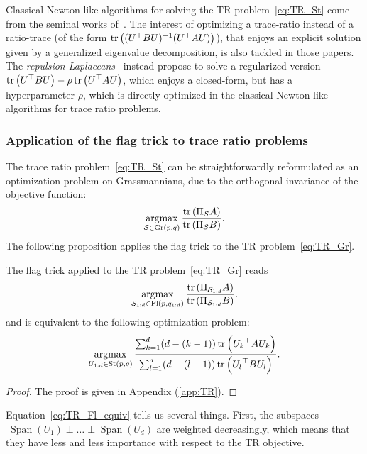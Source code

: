 Classical Newton-like algorithms for solving the TR problem~\eqref{eq:TR_St} come from the seminal works of~\citet{guo_generalized_2003, wang_trace_2007, jia_trace_2009}.
The interest of optimizing a trace-ratio instead of a ratio-trace (of the form $\operatorname{tr}\left((U^\top B U)^{-1}(U^\top A U)\right)$), that enjoys an explicit solution given by a generalized eigenvalue decomposition, is also tackled in those papers. The \textit{repulsion Laplaceans}~\citep{kokiopoulou_enhanced_2009} instead propose to solve a regularized version $\operatorname{tr}\left(U^\top B U\right) - \rho \operatorname{tr}\left(U^\top A U\right)$, which enjoys a closed-form, but has a hyperparameter $\rho$, which is directly optimized in the classical Newton-like algorithms for trace ratio problems.

\subsubsection{Application of the flag trick to trace ratio problems}
The trace ratio problem~\eqref{eq:TR_St} can be straightforwardly reformulated as an optimization problem on Grassmannians, due to the orthogonal invariance of the objective function:
\begin{equation}\label{eq:TR_Gr}
\underset{\mathcal{S} \in \operatorname{Gr}(p, q)}{\operatorname{argmax}} \, \frac{\operatorname{tr}\left(\Pi_{\mathcal{S}} A\right)}{\operatorname{tr}\left(\Pi_{\mathcal{S}} B\right)}.
\end{equation}
The following proposition applies the flag trick to the TR problem~\eqref{eq:TR_Gr}.
\begin{proposition}\label{prop:TR}
The flag trick applied to the TR problem~\eqref{eq:TR_Gr} reads
\begin{equation}\label{eq:TR_Fl}
	\underset{\mathcal{S}_{1:d} \in \operatorname{Fl}(p, q_{1:d})}{\operatorname{argmax}} \, \frac{\operatorname{tr}\left(\Pi_{\mathcal{S}_{1:d}} A\right)}{\operatorname{tr}\left(\Pi_{\mathcal{S}_{1:d}} B\right)}.
\end{equation}
and is equivalent to the following optimization problem:
\begin{equation}\label{eq:TR_Fl_equiv}
\underset{U_{1:d} \in \operatorname{St}(p, q)}{\operatorname{argmax}} \, \frac{\sum_{k=1}^{d} (d - (k-1)) \operatorname{tr}\left({U_k}^\top A {U_k}\right)}{\sum_{l=1}^{d} (d - (l-1)) \operatorname{tr}\left({U_{l}}^\top B {U_{l}}\right)}.
\end{equation}
\end{proposition}
\begin{proof}
The proof is given in Appendix (\autoref{app:TR}).
\end{proof}
Equation~\eqref{eq:TR_Fl_equiv} tells us several things. First, the subspaces $~{\operatorname{Span}(U_1) \perp \dots \perp \operatorname{Span}(U_d)}$ are weighted decreasingly, which means that they have less and less importance with respect to the TR objective.

